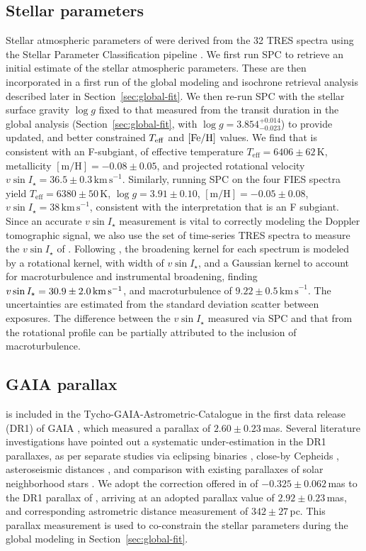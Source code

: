 \documentclass[apjl]{emulateapj}
\newcommand{\kms}{\ensuremath{\rm km\,s^{-1}}}
\newcommand{\teff}{\ensuremath{T_{\rm eff}}}
\newcommand{\logg}{\ensuremath{\log{g}}}
\newcommand{\vsini}{\ensuremath{v \sin{I_\star}}}
\newcommand{\feh}{\ensuremath{\rm [Fe/H]}}
\newcommand{\genevastarlogg}{\ensuremath{3.854_{-0.023}^{+0.014}}}              %
\begin{document}
\subsection{Stellar parameters}
\label{sec:stel_params}
 Stellar atmospheric parameters of \hatcur{} were derived from the 32 TRES spectra using the Stellar Parameter Classification pipeline \citep[SPC,][]{Buchave:2012}. We first run SPC to retrieve an initial estimate of the stellar atmospheric parameters. These are then incorporated in a first run of the global modeling and isochrone retrieval analysis described later in Section~\ref{sec:global-fit}. We then re-run SPC with the stellar surface gravity $\logg$ fixed to that measured from the transit duration in the global analysis (Section~\ref{sec:global-fit}, with $\logg = \genevastarlogg$) to provide updated, and better constrained $\teff$ and $\feh$ values. We find that \hatcur{} is consistent with an F-subgiant, of effective temperature $T_\mathrm{eff} = 6406 \pm 62\,\mathrm{K}$, metallicity $\mathrm{[m/H]} = -0.08 \pm 0.05$, and projected rotational velocity $v \sin I_\star = 36.5 \pm 0.3\,\mathrm{km\,s}^{-1}$. Similarly, running SPC on the four FIES spectra yield $T_\mathrm{eff} = 6380 \pm 50\,\mathrm{K}$, $\log g = 3.91 \pm 0.10$, $\mathrm{[m/H]} = -0.05 \pm 0.08$, $v\sin I_\star = 38\,\mathrm{km\,s}^{-1}$, consistent with the interpretation that \hatcur{} is an F subgiant. Since an accurate \vsini{} measurement is vital to correctly modeling the Doppler tomographic signal, we also use the set of time-series TRES spectra to measure the \vsini{} of \hatcur{}. Following \citet{Zhou:2016}, the broadening kernel for each spectrum is modeled by a rotational kernel, with width of \vsini{}, and a Gaussian kernel to account for macroturbulence and instrumental broadening, finding $\vsini =  30.9 \pm 2.0 \,\kms$, and macroturbulence of $9.22\pm0.5\,\mathrm{km\,s}^{-1}$. The uncertainties are estimated from the standard deviation scatter between exposures.  The difference between the \vsini{} measured via SPC and that from the rotational profile can be partially attributed to the inclusion of macroturbulence. 

\subsection{GAIA parallax}
\label{sec:gaia}
\hatcur{} is included in the Tycho-GAIA-Astrometric-Catalogue in the first data release (DR1) of GAIA \citep{2016arXiv160904303L}, which measured a parallax of $2.60 \pm 0.23$\,mas. Several literature investigations have pointed out a systematic under-estimation in the DR1 parallaxes, as per separate studies via eclipsing binaries \citep{2016ApJ...831L...6S}, close-by Cepheids \citep{2016arXiv160905175C}, asteroseismic distances \citep{2016arXiv161108776S}, and comparison with existing parallaxes of solar neighborhood stars \citep{2016ApJ...832L..18J}. We adopt the correction offered in \citet{2016ApJ...831L...6S} of $-0.325\pm 0.062$\,mas to the DR1 parallax of \hatcur{}, arriving at an adopted parallax value of $2.92 \pm 0.23$\,mas, and corresponding astrometric distance measurement of $342 \pm 27$\,pc. This parallax measurement is used to co-constrain the stellar parameters during the global modeling in Section~\ref{sec:global-fit}.
\end{document}
